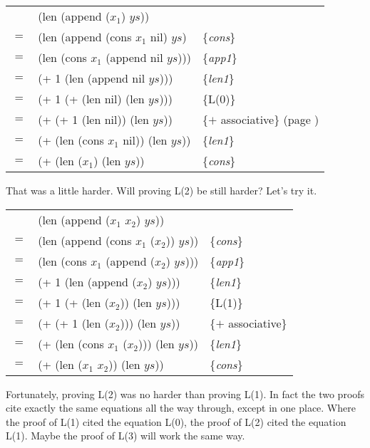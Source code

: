 \begin{center}
\begin{tabular}{lll}
    & (len (append ($x_1$) $ys$))           &                     \\
$=$ & (len (append (cons $x_1$ nil) $ys$)   & \{\emph{cons}\}     \\
$=$ & (len (cons $x_1$ (append nil $ys$)))  & \{\emph{app1}\}     \\
$=$ & (+ 1 (len (append nil $ys$)))         & \{\emph{len1}\}     \\
$=$ & (+ 1 (+ (len nil) (len $ys$)))        & \{L(0)\}            \\
$=$ & (+ (+ 1 (len nil)) (len $ys$))        & \{$+$ associative\} (page \pageref{fig-02-01}) \\
$=$ & (+ (len (cons $x_1$ nil)) (len $ys$)) & \{\emph{len1}\}     \\
$=$ & (+ (len ($x_1$) (len $ys$))           & \{\emph{cons}\}     \\
\end{tabular}
\end{center}

That was a little harder. Will proving L(2) be still harder? Let's try it.

\begin{center}
\begin{tabular}{lll}
    & (len (append ($x_1$ $x_2$) $ys$))         &                     \\
$=$ & (len (append (cons $x_1$ ($x_2$)) $ys$))  & \{\emph{cons}\}     \\
$=$ & (len (cons $x_1$ (append ($x_2$) $ys$)))  & \{\emph{app1}\}     \\
$=$ & (+ 1 (len (append ($x_2$) $ys$)))         & \{\emph{len1}\}     \\
$=$ & (+ 1 (+ (len ($x_2$)) (len $ys$)))        & \{L(1)\}            \\
$=$ & (+ (+ 1 (len ($x_2$))) (len $ys$))        & \{$+$ associative\} \\
$=$ & (+ (len (cons $x_1$ ($x_2$))) (len $ys$)) & \{\emph{len1}\}     \\
$=$ & (+ (len ($x_1$ $x_2$)) (len $ys$))        & \{\emph{cons}\}     \\
\end{tabular}
\end{center}

Fortunately, proving L(2) was no harder than proving L(1). In fact the two proofs cite exactly the same equations all the way through, except in one place. Where the proof of L(1) cited the equation L(0), the proof of L(2) cited the equation L(1). Maybe the proof of L(3) will work the same way.

